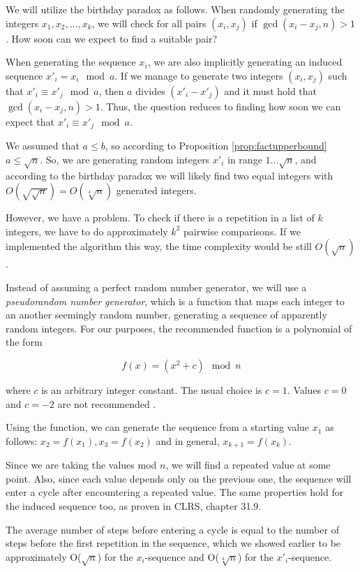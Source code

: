 \documentclass[12pt] {article}
\theoremstyle{plain}
\theoremstyle{definition}
\begin{document}
We will utilize the birthday paradox as follows. When randomly generating the integers $x_1, x_2, \dots, x_k$, we will check for all pairs $(x_i, x_j)$ if $\gcd(x_i - x_j, n) > 1$. How soon can we expect to find a suitable pair?

When generating the sequence $x_i$, we are also implicitly generating an induced sequence $x'_i = x_i \mod a$. If we manage to generate two integers $(x_i, x_j)$ such that $x'_i \equiv x'_j \mod a$, then $a$ divides $(x'_i-x'_j)$ and it must hold that $\gcd(x_i-x_j, n) > 1$. Thus, the question reduces to finding how soon we can expect that $x'_i \equiv x'_j \mod a$.

We assumed that $a \leq b$, so according to Proposition \ref{prop:factupperbound} $a \leq \sqrt{n}$. So, we are generating random integers $x'_i$ in range $1 \dots \sqrt{n}$, and according to the birthday paradox we will likely find two equal integers with $O(\sqrt{\sqrt{n}}) = O(\sqrt[4]{n})$ generated integers.

However, we have a problem. To check if there is a repetition in a list of $k$ integers, we have to do approximately $k^2$ pairwise comparisons. If we implemented the algorithm this way, the time complexity would be still $O(\sqrt{n})$.

Instead of assuming a perfect random number generator, we will use a \textit{pseudorandom number generator}, which is a function that maps each integer to an another seemingly random number, generating a sequence of apparently random integers. For our purposes, the recommended function is a polynomial of the form

\[
	f(x) = (x^2 + c) \mod n
\]

where $c$ is an arbitrary integer constant. The usual choice is $c = 1$. Values $c = 0$ and $c = -2$ are not recommended \cite{pollard}.

Using the function, we can generate the sequence from a starting value $x_1$ as follows: $x_2 = f(x_1), x_3 = f(x_2)$ and in general, $x_{k+1} = f(x_k)$.

Since we are taking the values mod $n$, we will find a repeated value at some point. Also, since each value depends only on the previous one, the sequence will enter a cycle after encountering a repeated value. The same properties hold for the induced sequence too, as proven in CLRS\cite{clrs}, chapter 31.9.

The average number of steps before entering a cycle is equal to the number of steps before the first repetition in the sequence, which we showed earlier to be approximately O($\sqrt{n}$) for the $x_i$-sequence and O($\sqrt[4]{n}$) for the $x'_i$-sequence.
\end{document}
